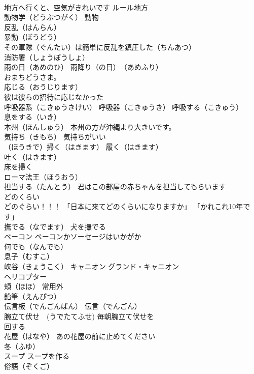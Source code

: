 \documentclass[8pt]{extreport}
\begin{document}
\begin{CJK}{UTF8}{min}
\\	地方へ行くと、空気がきれいです ルール地方
\\	動物学（どうぶつがく） 動物
\\	反乱（はんらん）
\\	暴動（ぼうどう）
\\	その軍隊（ぐんたい）は簡単に反乱を鎮圧した（ちんあつ）
\\	消防署（しょうぼうしょ）
\\	雨の日（あめのひ） 雨降り（の日）　（あめふり）
\\	おまちどうさま。
\\	応じる（おうじります） 
\\	彼は彼らの招待に応じなかった
\\	呼吸器系（こきゅうきけい） 呼吸器（こきゅうき） 呼吸する（こきゅう）
\\	息をする（いき） 
\\	本州（ほんしゅう） 本州の方が沖縄より大きいです。
\\	気持ち（きもち） 気持ちがいい
\\	（ほうきで）掃く（はきます） 履く（はきます） 
\\	吐く（はきます） 
\\	床を掃く
\\	ローマ法王（ほうおう）
\\	担当する（たんとう） 君はこの部屋の赤ちゃんを担当してもらいます
\\	どのくらい　
\\	どのぐらい！！！ 「日本に来てどのくらいになりますか」 「かれこれ10年です」
\\	撫でる（なでます） 犬を撫でる
\\	ベーコン ベーコンかソーセージはいかがか
\\	何でも（なんでも）
\\	息子（むすこ）
\\	峡谷（きょうこく） キャニオン グランド・キャニオン
\\	ヘリコプター
\\	頬（ほほ） 常用外
\\	鉛筆（えんぴつ）
\\	伝言板（でんごんばん） 伝言（でんごん）
\\	腕立て伏せ　(うでたてふせ) 毎朝腕立て伏せを 
\\	回する
\\	花屋（はなや） あの花屋の前に止めてください
\\	冬（ふゆ）
\\	スープ スープを作る
\\	俗語（ぞくご）

\end{CJK}
\end{document}
